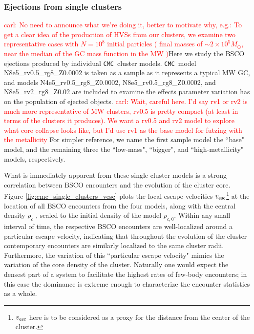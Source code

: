 \documentclass[twocolumn]{aastex631}
\newcommand{\CMC}{\texttt{CMC}}
\newcommand{\carl}[1]{\textcolor{red}{carl: #1}}
\begin{document}
\subsubsection{Ejections from single clusters} \label{subsubsec:single_clusters}

\carl{No need to announce what we're doing it, better to motivate why, e.g.: To get a clear idea of the production of HVSs from our clusters, we examine two representative cases with $N=10^8$ initial particles ( final masses of $\sim 2\times10^5M_{\odot}$, near the median of the GC mass function in the MW )}Here we study the BSCO ejections produced by individual \CMC\ cluster models.
\CMC\ model N8e5\_rv0.5\_rg8\_Z0.0002 is taken as a sample as it represents a typical MW GC, and models N4e5\_rv0.5\_rg8\_Z0.0002, N8e5\_rv0.5\_rg8\_Z0.0002, and N8e5\_rv2\_rg8\_Z0.02 are included to examine the effects parameter variation has on the population of ejected objects.  \carl{Wait, careful here.  I'd say rv1 or rv2 is much more representative of MW clusters, rv0.5 is pretty compact (at least in terms of the clusters it produces).  We want a rv0.5 and rv2 model to explore what core collapse looks like, but I'd use rv1 as the base model for futzing with the  metallicity}
For simpler reference, we name the first sample model the ``base" model, and the remaining three the ``low-mass", ``bigger", and ``high-metallicity" models, respectively.

What is immediately apparent from these single cluster models is a strong correlation between BSCO encounters and the evolution of the cluster core.
Figure \ref{fig:cmc_single_clusters_vesc} plots the local escape velocities $v_{\rm esc}$\footnote{$v_{\rm esc}$ here is to be considered as a proxy for the distance from the center of the cluster.} at the location of all BSCO encounters from the four models, along with the central density $\rho_c$ \citep{1985ApJ...298...80C}, scaled to the initial density of the model $\rho_{c,0}$.
Within any small interval of time, the respective BSCO encounters are well-localized around a particular escape velocity, indicating that throughout the evolution of the cluster contemporary encounters are similarly localized to the same cluster radii.
Furthermore, the variation of this ``particular escape velocity" mimics the variation of the core density of the cluster.
Naturally one would expect the densest part of a system to facilitate the highest rates of few-body encounters; in this case the dominance is extreme enough to characterize the encounter statistics as a whole.
\end{document}
